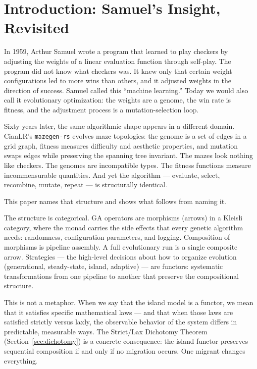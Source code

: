 \documentclass[10pt]{article}
\begin{document}
\section{Introduction: Samuel's Insight, Revisited}

In 1959, Arthur Samuel wrote a program that learned to play checkers by adjusting the weights of a linear evaluation function through self-play. The program did not know what checkers was. It knew only that certain weight configurations led to more wins than others, and it adjusted weights in the direction of success. Samuel called this ``machine learning.'' Today we would also call it evolutionary optimization: the weights are a genome, the win rate is fitness, and the adjustment process is a mutation-selection loop.

Sixty years later, the same algorithmic shape appears in a different domain. CianLR's \texttt{mazegen-rs} evolves maze topologies: the genome is a set of edges in a grid graph, fitness measures difficulty and aesthetic properties, and mutation swaps edges while preserving the spanning tree invariant. The mazes look nothing like checkers. The genomes are incompatible types. The fitness functions measure incommensurable quantities. And yet the algorithm --- evaluate, select, recombine, mutate, repeat --- is structurally identical.

This paper names that structure and shows what follows from naming it.

The structure is categorical. GA operators are morphisms (arrows) in a Kleisli category, where the monad carries the side effects that every genetic algorithm needs: randomness, configuration parameters, and logging. Composition of morphisms is pipeline assembly. A full evolutionary run is a single composite arrow. Strategies --- the high-level decisions about how to organize evolution (generational, steady-state, island, adaptive) --- are functors: systematic transformations from one pipeline to another that preserve the compositional structure.

This is not a metaphor. When we say that the island model is a functor, we mean that it satisfies specific mathematical laws --- and that when those laws are satisfied strictly versus laxly, the observable behavior of the system differs in predictable, measurable ways. The Strict/Lax Dichotomy Theorem (Section~\ref{sec:dichotomy}) is a concrete consequence: the island functor preserves sequential composition if and only if no migration occurs. One migrant changes everything.
\end{document}
